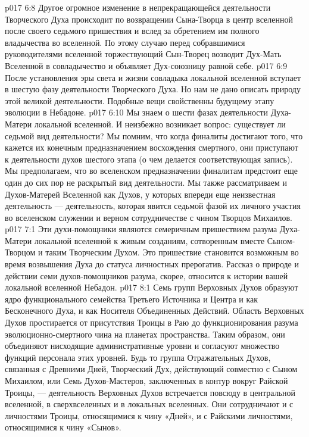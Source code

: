 \vs p017 6:8 \bibnobreakspace {} Другое огромное изменение в непрекращающейся деятельности Творческого Духа происходит по возвращении Сына\hyp{}Творца в центр вселенной после своего седьмого пришествия и вслед за обретением им полного владычества во вселенной. По этому случаю перед собравшимися руководителями вселенной торжествующий Сын\hyp{}Творец возводит Дух\hyp{}Мать Вселенной в совладычество и объявляет Дух\hyp{}союзницу равной себе.
\vs p017 6:9 \bibnobreakspace {} После установления эры света и жизни совладыка локальной вселенной вступает в шестую фазу деятельности Творческого Духа. Но нам не дано описать природу этой великой деятельности. Подобные вещи свойственны будущему этапу эволюции в Небадоне.
\vs p017 6:10 \bibnobreakspace {} Мы знаем о шести фазах деятельности Духа\hyp{}Матери локальной вселенной. И неизбежно возникает вопрос: существует ли седьмой вид деятельности? Мы помним, что когда финалиты достигают того, что кажется их конечным предназначением восхождения смертного, они приступают к деятельности духов шестого этапа (о чем делается соответствующая запись). Мы предполагаем, что во вселенском предназначении финалитам предстоит еще один до сих пор не раскрытый вид деятельности. Мы также рассматриваем и Духов\hyp{}Матерей Вселенной как Духов, у которых впереди еще неизвестная деятельность --- деятельность, которая явится седьмой фазой их личного участия во вселенском служении и верном сотрудничестве с чином Творцов Михаилов.
\vs p017 7:1 Эти духи\hyp{}помощники являются семеричным пришествием разума Духа\hyp{}Матери локальной вселенной к живым созданиям, сотворенным вместе Сыном\hyp{}Творцом и таким Творческим Духом. Это пришествие становится возможным во время возвышения Духа до статуса личностных прерогатив. Рассказ о природе и действии семи духов\hyp{}помощников разума, скорее, относится к истории вашей локальной вселенной Небадон.
\vs p017 8:1 Семь групп Верховных Духов образуют ядро функционального семейства Третьего Источника и Центра и как Бесконечного Духа, и как Носителя Объединенных Действий. Область Верховных Духов простирается от присутствия Троицы в Раю до функционирования разума эволюционно\hyp{}смертного чина на планетах пространства. Таким образом, они объединяют нисходящие административные уровни и согласуют множество функций персонала этих уровней. Будь то группа Отражательных Духов, связанная с Древними Дней, Творческий Дух, действующий совместно с Сыном Михаилом, или Семь Духов\hyp{}Мастеров, заключенных в контур вокруг Райской Троицы, --- деятельность Верховных Духов встречается повсюду в центральной вселенной, в сверхвселенных и в локальных вселенных. Они сотрудничают и с личностями Троицы, относящимися к чину «Дней», и с Райскими личностями, относящимися к чину «Сынов».
